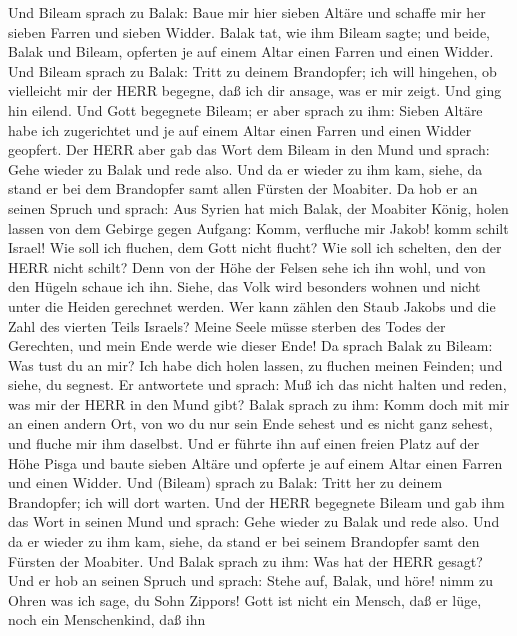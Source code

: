  Und Bileam sprach zu Balak: Baue mir hier sieben Altäre und
schaffe mir her sieben Farren und sieben Widder.  Balak tat,
wie ihm Bileam sagte; und beide, Balak und Bileam, opferten je auf einem
Altar einen Farren und einen Widder.  Und Bileam sprach zu
Balak: Tritt zu deinem Brandopfer; ich will hingehen, ob vielleicht mir
der HERR begegne, daß ich dir ansage, was er mir zeigt. Und ging hin
eilend.  Und Gott begegnete Bileam; er aber sprach zu ihm:
Sieben Altäre habe ich zugerichtet und je auf einem Altar einen Farren
und einen Widder geopfert.  Der HERR aber gab das Wort dem
Bileam in den Mund und sprach: Gehe wieder zu Balak und rede also.
 Und da er wieder zu ihm kam, siehe, da stand er bei dem
Brandopfer samt allen Fürsten der Moabiter.  Da hob er an
seinen Spruch und sprach: Aus Syrien hat mich Balak, der Moabiter König,
holen lassen von dem Gebirge gegen Aufgang: Komm, verfluche mir Jakob!
komm schilt Israel!  Wie soll ich fluchen, dem Gott nicht
flucht? Wie soll ich schelten, den der HERR nicht schilt? 
Denn von der Höhe der Felsen sehe ich ihn wohl, und von den Hügeln
schaue ich ihn. Siehe, das Volk wird besonders wohnen und nicht unter
die Heiden gerechnet werden.  Wer kann zählen den Staub
Jakobs und die Zahl des vierten Teils Israels? Meine Seele müsse sterben
des Todes der Gerechten, und mein Ende werde wie dieser Ende!
 Da sprach Balak zu Bileam: Was tust du an mir? Ich habe
dich holen lassen, zu fluchen meinen Feinden; und siehe, du segnest.
 Er antwortete und sprach: Muß ich das nicht halten und
reden, was mir der HERR in den Mund gibt?  Balak sprach zu
ihm: Komm doch mit mir an einen andern Ort, von wo du nur sein Ende
sehest und es nicht ganz sehest, und fluche mir ihm daselbst.
 Und er führte ihn auf einen freien Platz auf der Höhe
Pisga und baute sieben Altäre und opferte je auf einem Altar einen
Farren und einen Widder.  Und (Bileam) sprach zu Balak:
Tritt her zu deinem Brandopfer; ich will dort warten.  Und
der HERR begegnete Bileam und gab ihm das Wort in seinen Mund und
sprach: Gehe wieder zu Balak und rede also.  Und da er
wieder zu ihm kam, siehe, da stand er bei seinem Brandopfer samt den
Fürsten der Moabiter. Und Balak sprach zu ihm: Was hat der HERR gesagt?
 Und er hob an seinen Spruch und sprach: Stehe auf, Balak,
und höre! nimm zu Ohren was ich sage, du Sohn Zippors! 
Gott ist nicht ein Mensch, daß er lüge, noch ein Menschenkind, daß ihn

